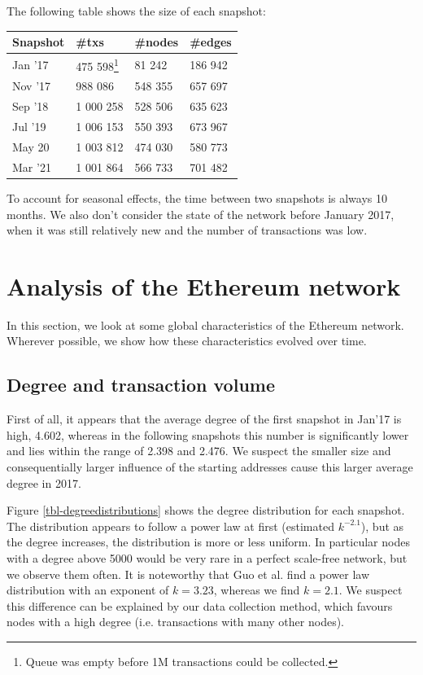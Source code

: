 \documentclass[10pt,a4paper]{article}
\begin{document}
\begin{multicols}{2}
The following table shows the size of each snapshot:\\
\begin{minipage}{\textwidth}
\vspace{5pt}
\bgroup
\def\arraystretch{1.5}
\begin{tabular}{p{}|p{}|p{}|p{}}
\textbf{Snapshot} & \textbf{\#txs} & \textbf{\#nodes} & \textbf{\#edges} \\ 
\hline 
Jan '17 & 475 598\footnote{Queue was empty before 1M transactions could be collected.}& 81 242 & 186 942  \\
Nov '17 & 988 086 & 548 355 & 657 697  \\
Sep '18 & 1 000 258 & 528 506 & 635 623 \\
Jul '19 & 1 006 153 & 550 393 & 673 967 \\
May 20 & 1 003 812 & 474 030 & 580 773 \\
Mar '21 & 1 001 864 & 566 733 & 701 482 \\
\end{tabular}
\egroup
\end{minipage}

\vspace{5pt}
To account for seasonal effects, the time between two snapshots is always 10 months. We also don't consider the state of the network before January 2017, when it was still relatively new and the number of transactions was low.

\section{Analysis of the Ethereum network}
In this section, we look at some global characteristics of the Ethereum network. Wherever possible, we show how these characteristics evolved over time.
\subsection{Degree and transaction volume}
First of all, it appears that the average degree of the first snapshot in Jan'17 is high, 4.602, whereas in the following snapshots this number is significantly lower and lies within the range of 2.398 and 2.476. We suspect the smaller size and consequentially larger influence of the starting addresses cause this larger average degree in 2017.

Figure \ref{tbl-degreedistributions} shows the degree distribution for each snapshot. The distribution appears to follow a power law at first (estimated $k^{-2.1}$), but as the degree increases, the distribution is more or less uniform. In particular nodes with a degree above 5000 would be very rare in a perfect scale-free network, but we observe them often. It is noteworthy that Guo et al. \cite{GUO201958} find a power law distribution with an exponent of $k = 3.23$, whereas we find $k=2.1$. We suspect this difference can be explained by our data collection method, which favours nodes with a high degree (i.e. transactions with many other nodes).


\end{multicols}
\end{document}
